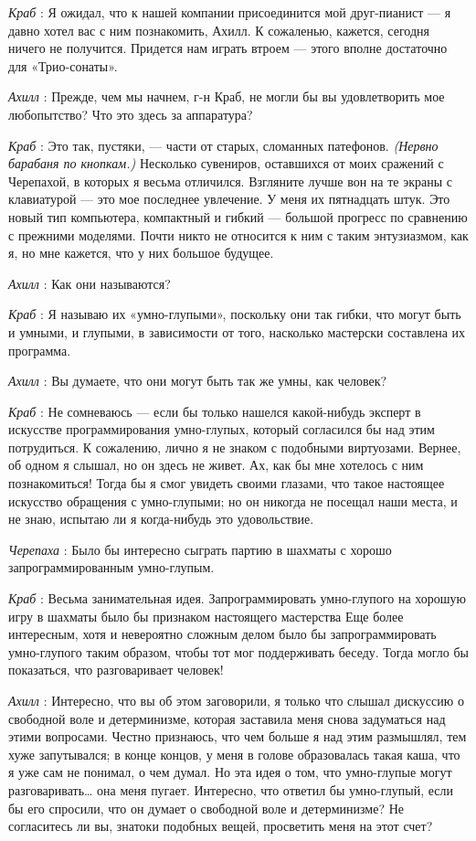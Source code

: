 \documentclass[../main.tex]{subfiles}
\begin{document}
\begin{dialogue}
\emph{Краб} : Я ожидал, что к нашей компании присоединится мой друг-пианист --- я давно хотел вас с ним познакомить, Ахилл. К сожаленью, кажется, сегодня ничего не получится. Придется нам играть втроем --- этого вполне достаточно для «Трио-сонаты».

\emph{Ахилл} : Прежде, чем мы начнем, г-н Краб, не могли бы вы удовлетворить мое любопытство? Что это здесь за аппаратура?

\emph{Краб} : Это так, пустяки, --- части от старых, сломанных патефонов. \emph{(Нервно барабаня по кнопкам.)} Несколько сувениров, оставшихся от моих сражений с Черепахой, в которых я весьма отличился. Взгляните лучше вон на те экраны с клавиатурой --- это мое последнее увлечение. У меня их пятнадцать штук. Это новый тип компьютера, компактный и гибкий --- большой прогресс по сравнению с прежними моделями. Почти никто не относится к ним с таким энтузиазмом, как я, но мне кажется, что у них большое будущее.

\emph{Ахилл} : Как они называются?

\emph{Краб} : Я называю их «умно-глупыми», поскольку они так гибки, что могут быть и умными, и глупыми, в зависимости от того, насколько мастерски составлена их программа.

\emph{Ахилл} : Вы думаете, что они могут быть так же умны, как человек?

\emph{Краб} : Не сомневаюсь --- если бы только нашелся какой-нибудь эксперт в искусстве программирования умно-глупых, который согласился бы над этим потрудиться. К сожалению, лично я не знаком с подобными виртуозами. Вернее, об одном я слышал, но он здесь не живет. Ах, как бы мне хотелось с ним познакомиться! Тогда бы я смог увидеть своими глазами, что такое настоящее искусство обращения с умно-глупыми; но он никогда не посещал наши места, и не знаю, испытаю ли я когда-нибудь это удовольствие.

\emph{Черепаха} : Было бы интересно сыграть партию в шахматы с хорошо запрограммированным умно-глупым.

\emph{Краб} : Весьма занимательная идея. Запрограммировать умно-глупого на хорошую игру в шахматы было бы признаком настоящего мастерства Еще более интересным, хотя и невероятно сложным делом было бы запрограммировать умно-глупого таким образом, чтобы тот мог поддерживать беседу. Тогда могло бы показаться, что разговаривает человек!

\emph{Ахилл} : Интересно, что вы об этом заговорили, я только что слышал дискуссию о свободной воле и детерминизме, которая заставила меня снова задуматься над этими вопросами. Честно признаюсь, что чем больше я над этим размышлял, тем хуже запутывался; в конце концов, у меня в голове образовалась такая каша, что я уже сам не понимал, о чем думал. Но эта идея о том, что умно-глупые могут разговаривать\ldots{} она меня пугает. Интересно, что ответил бы умно-глупый, если бы его спросили, что он думает о свободной воле и детерминизме? Не согласитесь ли вы, знатоки подобных вещей, просветить меня на этот счет?


\end{dialogue}
\end{document}
